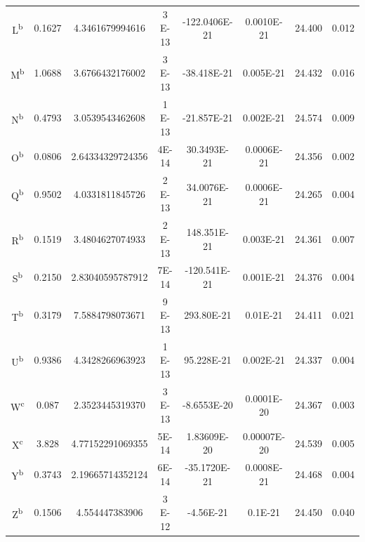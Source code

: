 \begin{table}
\begin{tabular}{c c c c c c c c}
		L\textsuperscript{b}          & 0.1627       & 4.3461679994616  & \num{3 E-13}    & \num{-122.0406E-21} & \num{0.0010E-21}       & 24.400      & 0.012               \\
		M\textsuperscript{b}          & 1.0688       & 3.6766432176002  & \num{3 E-13}    & \num{-38.418E-21}   & \num{0.005E-21}        & 24.432      & 0.016               \\
		N\textsuperscript{b}          & 0.4793       & 3.0539543462608  & \num{1 E-13}    & \num{-21.857E-21}   & \num{0.002E-21}        & 24.574      & 0.009               \\
		O\textsuperscript{b}          & 0.0806       & 2.64334329724356 & \num{4E-14}     & \num{30.3493E-21}   & \num{0.0006E-21}       & 24.356      & 0.002               \\
		Q\textsuperscript{b}          & 0.9502       & 4.0331811845726  & \num{2 E-13}    & \num{34.0076E-21}   & \num{0.0006E-21}       & 24.265      & 0.004               \\
		R\textsuperscript{b}          & 0.1519       & 3.4804627074933  & \num{2 E-13}    & \num{148.351E-21}   & \num{0.003E-21}        & 24.361      & 0.007               \\
		S\textsuperscript{b}          & 0.2150       & 2.83040595787912 & \num{7E-14}     & \num{-120.541E-21}  & \num{0.001E-21}        & 24.376      & 0.004               \\
		T\textsuperscript{b}          & 0.3179       & 7.5884798073671  & \num{9 E-13}    & \num{293.80E-21}    & \num{0.01E-21}         & 24.411      & 0.021               \\
		U\textsuperscript{b}          & 0.9386       & 4.3428266963923  & \num{1 E-13}    & \num{95.228E-21}    & \num{0.002E-21}        & 24.337      & 0.004               \\
		W\textsuperscript{c}          & 0.087        & 2.3523445319370  & \num{3 E-13}    & \num{-8.6553E-20}   & \num{0.0001E-20}       & 24.367      & 0.003               \\
		X\textsuperscript{c}          & 3.828        & 4.77152291069355 & \num{5E-14}     & \num{1.83609E-20}   & \num{0.00007E-20}      & 24.539      & 0.005               \\
		Y\textsuperscript{b}          & 0.3743       & 2.19665714352124 & \num{6E-14}     & \num{-35.1720E-21}  & \num{0.0008E-21}       & 24.468      & 0.004               \\
		Z\textsuperscript{b}          & 0.1506       & 4.554447383906   & \num{3  E-12}   & \num{-4.56E-21}     & \num{0.1E-21}          & 24.450      & 0.040               \\
		\hline
	\end{tabular}

	\label{tab:pulsars_spin}

\end{table}



